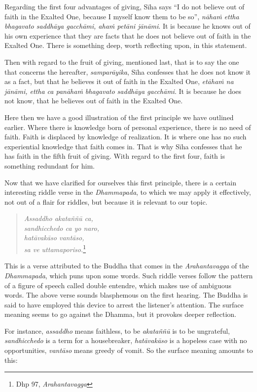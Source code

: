 Regarding the first four advantages of giving, Sīha says ``I do not believe out of faith in the Exalted One, because I myself know them to be so'', \emph{nāhaṁ ettha bhagavato saddhāya gacchāmi, ahaṁ petāni jānāmi}. It is because he knows out of his own experience that they are facts that he does not believe out of faith in the Exalted One. There is something deep, worth reflecting upon, in this statement.

Then with regard to the fruit of giving, mentioned last, that is to say the one that concerns the hereafter, \emph{samparāyika}, Sīha confesses that he does not know it as a fact, but that he believes it out of faith in the Exalted One, \emph{etāhaṁ na jānāmi, ettha ca panāhaṁ bhagavato saddhāya gacchāmi}. It is because he does not know, that he believes out of faith in the Exalted One.

Here then we have a good illustration of the first principle we have outlined earlier. Where there is knowledge born of personal experience, there is no need of faith. Faith is displaced by knowledge of realization. It is where one has no such experiential knowledge that faith comes in. That is why Sīha confesses that he has faith in the fifth fruit of giving. With regard to the first four, faith is something redundant for him.

Now that we have clarified for ourselves this first principle, there is a certain interesting riddle verse in the \emph{Dhammapada}, to which we may apply it effectively, not out of a flair for riddles, but because it is relevant to our topic.

\begin{quote}
\emph{Assaddho akataññū ca,}\\
\emph{sandhicchedo ca yo naro,}\\
\emph{hatāvakāso vantāso,}\\
\emph{sa ve uttamaporiso.}\footnote{Dhp 97, \emph{Arahantavagga}}
\end{quote}

This is a verse attributed to the Buddha that comes in the \emph{Arahantavagga} of the \emph{Dhammapada}, which puns upon some words. Such riddle verses follow the pattern of a figure of speech called double entendre, which makes use of ambiguous words. The above verse sounds blasphemous on the first hearing. The Buddha is said to have employed this device to arrest the listener's attention. The surface meaning seems to go against the Dhamma, but it provokes deeper reflection.

For instance, \emph{assaddho} means faithless, to be \emph{akataññū} is to be ungrateful, \emph{sandhicchedo} is a term for a housebreaker, \emph{hatāvakāso} is a hopeless case with no opportunities, \emph{vantāso} means greedy of vomit. So the surface meaning amounts to this:

